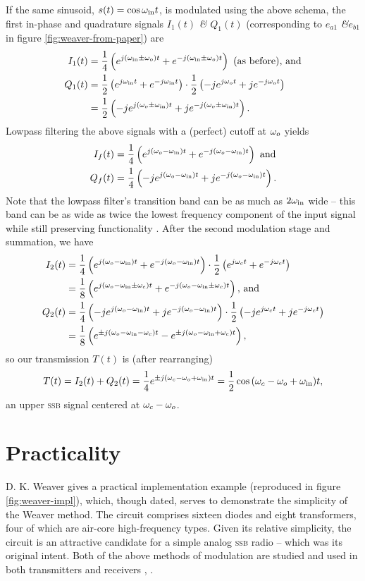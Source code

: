 \documentclass[12pt]{article}
\newcommand{\amp}{\textit{\&}\xspace}
\newcommand{\ssb}{\textsc{ssb}\xspace}
\begin{document}
If the same sinusoid, \(s(t) = \cos \omega_\text{in} t\), is modulated using the
above schema, the first in-phase and quadrature signals \(I_1(t)\) \amp
\(Q_1(t)\) (corresponding to \(e_{a1}\) \amp \(e_{b1}\) in figure
\ref{fig:weaver-from-paper}) are
\begin{align*}
	I_1(t) &= \frac 1 4 \left(
			e^{j (\omega_\text{in} \pm \omega_o) t} + e^{-j (\omega_\text{in} \pm \omega_o) t}
		\right) \text{ (as before), and} \\
	Q_1(t) &= \frac 1 2 \left(e^{j \omega_\text{in} t} + e^{-j \omega_\text{in} t}\right)
			\cdot \frac 1 2 \left(
				-j e^{j \omega_o t} + j e^{-j \omega_o t}\right
			) \\
		&= \frac 1 2 \left(
			-j e^{j (\omega_o \pm \omega_\text{in}) t} + j e^{-j (\omega_o \pm \omega_\text{in}) t}
		\right).
\end{align*}
Lowpass filtering the above signals with a (perfect) cutoff at \(\omega_o\) yields
\begin{align*}
	I_f(t) &= \frac 1 4 \left(
			e^{j (\omega_o - \omega_\text{in}) t} + e^{-j (\omega_o - \omega_\text{in}) t}
		\right) \text{ and} \\
	Q_f(t) &= \frac 1 4 \left(
			-j e^{j (\omega_o - \omega_\text{in}) t} + j e^{-j (\omega_o - \omega_\text{in}) t}
		\right).
\end{align*}
Note that the lowpass filter's transition band can be as much as \(2 \omega_\text{in}\)
wide -- this band can be as wide as twice the lowest frequency component of the
input signal while still preserving functionality \autocite{weaver-rowell}.
After the second modulation stage and summation, we have
\begin{align*}
	I_2(t) &= \frac 1 4 \left(
			e^{j (\omega_o - \omega_\text{in}) t} + e^{-j (\omega_o - \omega_\text{in}) t}
		\right) \cdot \frac 1 2 \left(
			e^{j \omega_c t} + e^{-j \omega_c t}
		\right) \\
		&= \frac 1 8 \left(
			e^{j (\omega_o - \omega_\text{in} \pm \omega_c) t}
			+ e^{-j (\omega_o - \omega_\text{in} \pm \omega_c) t}
		\right) \text{, and} \\
	Q_2(t) &= \frac 1 4 \left(
			-j e^{j (\omega_o - \omega_\text{in}) t} + j e^{-j (\omega_o - \omega_\text{in}) t}
		\right) \cdot \frac 1 2 \left(
			-j e^{j \omega_c t} + j e^{-j \omega_c t}
		\right) \\
		&= \frac 1 8 \left(
			e^{\pm j (\omega_o - \omega_\text{in} - \omega_c) t}
			- e^{\pm j (\omega_o - \omega_\text{in} + \omega_c) t}
		\right),
\end{align*}
so our transmission \(T(t)\) is (after rearranging)
\[
	T(t) = I_2(t) + Q_2(t) = \frac 1 4 e^{\pm j (\omega_c - \omega_o + \omega_\text{in}) t}
		= \frac 1 2 \cos\, (\omega_c - \omega_o + \omega_\text{in}) t,
\]
an upper \ssb signal centered at \(\omega_c - \omega_o\).

\section*{Practicality}
D. K. Weaver gives a practical implementation example (reproduced in figure
\ref{fig:weaver-impl}), which, though dated, serves to demonstrate the
simplicity of the Weaver method. The circuit comprises sixteen diodes and eight
transformers, four of which are air-core high-frequency types. Given its
relative simplicity, the circuit is an attractive candidate for a simple analog
\ssb radio -- which was its original intent. Both of the above methods of
modulation are studied and used in both transmitters and receivers
\autocite{ssb-thaddeus}, \autocite{rf-microelectronics}.
\end{document}
